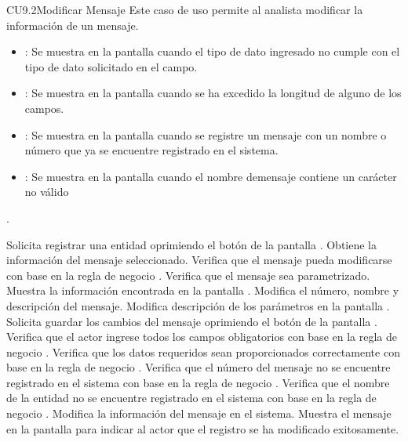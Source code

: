 \begin{UseCase}{CU9.2}{Modificar Mensaje}{
		Este caso de uso permite al analista modificar la información de un mensaje.
	}
{\begin{itemize}
		\item {}: Se muestra en la pantalla  cuando el tipo de dato ingresado no cumple con el tipo de dato solicitado en el campo.
		\item {}: Se muestra en la pantalla  cuando se ha excedido la longitud de alguno de los campos.
		\item {}: Se muestra en la pantalla  cuando se registre un mensaje con un nombre o número que ya se encuentre registrado en el sistema.
		\item {}: Se muestra en la pantalla  cuando el nombre demensaje contiene un carácter no válido
		\end{itemize}.
		}
	\end{UseCase}
	\begin{UCtrayectoria}
		\UCpaso[\UCactor] Solicita registrar una entidad oprimiendo el botón \editar de la pantalla .
		\UCpaso[\UCsist] Obtiene la información del mensaje seleccionado.
		\UCpaso[\UCsist] Verifica que el mensaje pueda modificarse con base en la regla de negocio . 
		\UCpaso[\UCsist] Verifica que el mensaje sea parametrizado.
		\UCpaso[\UCsist] Muestra la información encontrada en la pantalla . 
		\UCpaso[\UCactor] Modifica el número, nombre y descripción del mensaje. \label{CU9.2-P6}
		\UCpaso[\UCactor] Modifica descripción de los parámetros en la pantalla .
		\UCpaso[\UCactor] Solicita guardar los cambios del mensaje oprimiendo el botón  de la pantalla . \label{CU9.2-P8}  
		\UCpaso[\UCsist] Verifica que el actor ingrese todos los campos obligatorios con base en la regla de negocio . 
		\UCpaso[\UCsist] Verifica que los datos requeridos sean proporcionados correctamente con base en la regla de negocio .  
		\UCpaso[\UCsist] Verifica que el número del mensaje no se encuentre registrado en el sistema con base en la regla de negocio . 
		\UCpaso[\UCsist] Verifica que el nombre de la entidad no se encuentre registrado en el sistema con base en la regla de negocio .  
		\UCpaso[\UCsist] Modifica la información del mensaje en el sistema.
		\UCpaso[\UCsist] Muestra el mensaje  en la pantalla  para indicar al actor que el registro se ha modificado exitosamente.
	\end{UCtrayectoria}		
